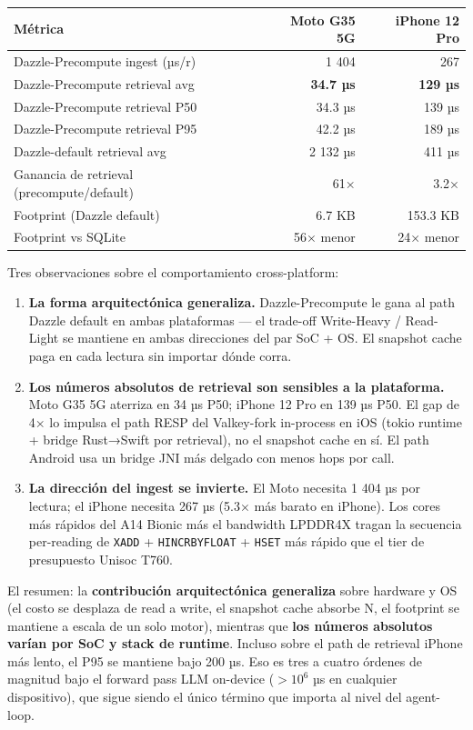 {\def\LTcaptype{none} %
\begin{longtable}[]{@{}lrr@{}}
\toprule\noalign{}
Métrica & Moto G35 5G & iPhone 12 Pro \\
\midrule\noalign{}
\endhead
\bottomrule\noalign{}
\endlastfoot
Dazzle-Precompute ingest (µs/r) & 1 404 & 267 \\
Dazzle-Precompute retrieval avg & \textbf{34.7 µs} & \textbf{129 µs} \\
Dazzle-Precompute retrieval P50 & 34.3 µs & 139 µs \\
Dazzle-Precompute retrieval P95 & 42.2 µs & 189 µs \\
Dazzle-default retrieval avg & 2 132 µs & 411 µs \\
Ganancia de retrieval (precompute/default) & 61× & 3.2× \\
Footprint (Dazzle default) & 6.7 KB & 153.3 KB \\
Footprint vs SQLite & 56× menor & 24× menor \\
\end{longtable}
}

Tres observaciones sobre el comportamiento cross-platform:

\begin{enumerate}
\def\labelenumi{\arabic{enumi}.}
\item
  \textbf{La forma arquitectónica generaliza.} Dazzle-Precompute le gana al path
  Dazzle default en ambas plataformas --- el trade-off Write-Heavy / Read-Light
  se mantiene en ambas direcciones del par SoC + OS. El snapshot cache paga en
  cada lectura sin importar dónde corra.
\item
  \textbf{Los números absolutos de retrieval son sensibles a la plataforma.}
  Moto G35 5G aterriza en 34 µs P50; iPhone 12 Pro en 139 µs P50. El gap de 4×
  lo impulsa el path RESP del Valkey-fork in-process en iOS (tokio runtime +
  bridge Rust→Swift por retrieval), no el snapshot cache en sí. El path Android
  usa un bridge JNI más delgado con menos hops por call.
\item
  \textbf{La dirección del ingest se invierte.} El Moto necesita 1 404 µs por
  lectura; el iPhone necesita 267 µs (5.3× más barato en iPhone). Los cores más
  rápidos del A14 Bionic más el bandwidth LPDDR4X tragan la secuencia
  per-reading de \texttt{XADD} + \texttt{HINCRBYFLOAT} + \texttt{HSET} más
  rápido que el tier de presupuesto Unisoc T760.
\end{enumerate}

El resumen: la \textbf{contribución arquitectónica generaliza} sobre hardware y
OS (el costo se desplaza de read a write, el snapshot cache absorbe N, el
footprint se mantiene a escala de un solo motor), mientras que \textbf{los
números absolutos varían por SoC y stack de runtime}. Incluso sobre el path de
retrieval iPhone más lento, el P95 se mantiene bajo 200 µs. Eso es tres a cuatro
órdenes de magnitud bajo el forward pass LLM on-device (\(>10^{6}\) µs en
cualquier dispositivo), que sigue siendo el único término que importa al nivel
del agent-loop.

